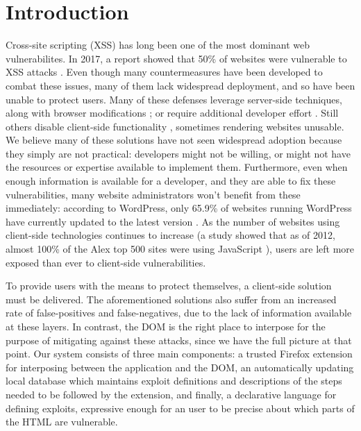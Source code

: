 \section{Introduction}

Cross-site scripting (XSS) has long been one of the most dominant web vulnerabilites. In 2017, a report showed that 50\% of websites were vulnerable to XSS attacks \cite{Acunetix}. Even though many countermeasures have been developed to combat these issues, many of them lack widespread deployment, and so have been unable to protect users. Many of these defenses leverage server-side techniques, along with browser modifications \cite{Jim:2007:DSI:1242572.1242654,Nadji:2009}; or require additional developer effort \cite{10.1007/978-3-319-66399-9_7}. Still others disable client-side functionality \cite{Noscript,Snyder:2017:MWD:3133956.3133966}, sometimes rendering websites unusable. We believe many of these solutions have not seen widespread adoption because they simply are not practical: developers might not be willing, or might not have the resources or expertise available to implement them. Furthermore, even when enough information is available for a developer, and they are able to fix these vulnerabilities, many website administrators won't benefit from these immediately: according to WordPress, only 65.9\% of websites running WordPress have currently updated to the latest version \cite{WPStats}. As the number of websites using client-side technologies continues to increase (a study showed that as of 2012, almost 100\% of the Alex top 500 sites were using JavaScript \cite{Stock:2017:WTI:3241189.3241265}), users are left more exposed than ever to client-side vulnerabilities.

To provide users with the means to protect themselves, a client-side solution must be delivered. The aforementioned solutions also suffer from an increased rate of false-positives and false-negatives, due to the lack of information available at these layers. In contrast, the DOM is the right place to interpose for the purpose of mitigating against these attacks, since we have the full picture at that point. Our system consists of three main components: a trusted Firefox extension for interposing between the application and the DOM, an automatically updating local database which maintains exploit definitions and descriptions of the steps needed to be followed by the extension, and finally, a declarative language for defining exploits, expressive enough for an user to be precise about which parts of the HTML are vulnerable. 


